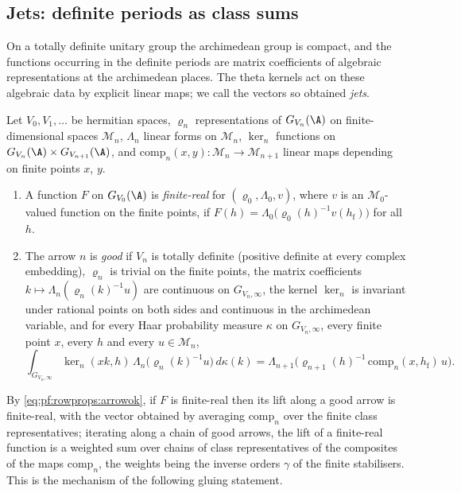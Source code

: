 \subsection{Jets: definite periods as class sums}\label{sec:pf:rowprops:jets}

On a totally definite unitary group the archimedean group is compact, and the functions occurring in the definite
periods are matrix coefficients of algebraic representations at the archimedean places. The theta kernels act on these
algebraic data by explicit linear maps; we call the vectors so obtained \emph{jets}.

\begin{definition}\label{def:pf:rowprops:jetdata}
Let $V_0,V_1,\dots$ be hermitian spaces, $\varrho_n$ representations of $G_{V_n}(\A)$ on finite-dimensional spaces
$\mathcal M_n$, $\Lambda_n$ linear forms on $\mathcal M_n$, $\ker_n$ functions on $G_{V_n}(\A)\times G_{V_{n+1}}(\A)$, and
$\mathrm{comp}_n(x,y):\mathcal M_n\to\mathcal M_{n+1}$ linear maps depending on finite points $x$, $y$.
\begin{enumerate}[label=(\alph*)]
\item A function $F$ on $G_{V_0}(\A)$ is \emph{finite-real} for $(\varrho_0,\Lambda_0,v)$, where $v$ is an
$\mathcal M_0$-valued function on the finite points, if $F(h)=\Lambda_0\bigl(\varrho_0(h)^{-1}v(h_{\mathrm f})\bigr)$ for all $h$.
\item The arrow $n$ is \emph{good} if $V_n$ is totally definite (positive definite at every complex embedding), $\varrho_n$
is trivial on the finite points, the matrix coefficients $k\mapsto\Lambda_n(\varrho_n(k)^{-1}u)$ are continuous on
$G_{V_n,\infty}$, the kernel $\ker_n$ is invariant under rational points on both sides and continuous in the archimedean
variable, and for every Haar probability measure $\kappa$ on $G_{V_n,\infty}$, every finite point $x$, every $h$ and every
$u\in\mathcal M_n$,
\begin{equation}\label{eq:pf:rowprops:arrowok}
\int_{G_{V_n,\infty}}\ker_n(xk,h)\,\Lambda_n\bigl(\varrho_n(k)^{-1}u\bigr)\,d\kappa(k)=\Lambda_{n+1}\bigl(\varrho_{n+1}(h)^{-1}\,
\mathrm{comp}_n(x,h_{\mathrm f})\,u\bigr).
\end{equation}
\end{enumerate}
\end{definition}

By \eqref{eq:pf:rowprops:arrowok}, if $F$ is finite-real then its lift along a good arrow is finite-real, with the vector
obtained by averaging $\mathrm{comp}_n$ over the finite class representatives; iterating along a chain of good arrows,
the lift of a finite-real function is a weighted sum over chains of class representatives of the composites of the maps
$\mathrm{comp}_n$, the weights being the inverse orders $\gamma$ of the finite stabilisers. This is the mechanism of the
following gluing statement.

